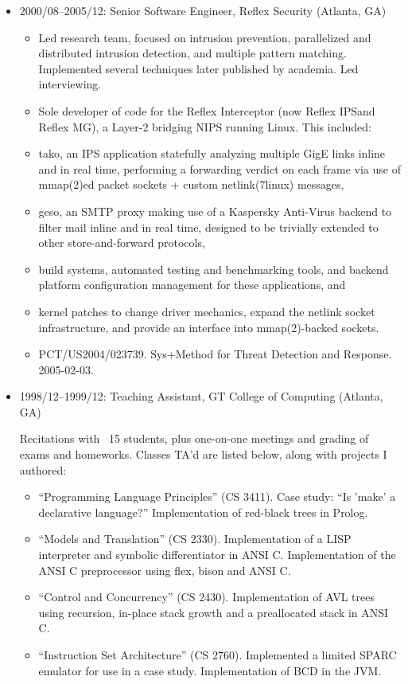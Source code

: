 \documentclass{article}
\newenvironment{tightitemize}
{\begin{itemize}
  \setlength{\itemsep}{1pt}
  \setlength{\parskip}{0pt}
  \setlength{\parsep}{0pt}}
{\end{itemize}}
\begin{document}
\begin{tightitemize}
\item 2000/08--2005/12: Senior Software Engineer, Reflex Security (Atlanta, GA)

\begin{tightitemize}
\item Led research team, focused on intrusion prevention, parallelized and
  distributed intrusion detection, and multiple pattern matching. Implemented
  several techniques later published by academia. Led interviewing.
\item Sole developer of code for the Reflex Interceptor (now Reflex IPS\texttrademark and
  Reflex MG\texttrademark), a Layer-2 bridging NIPS running Linux. This included:
    \item tako, an IPS application statefully analyzing multiple GigE links inline
      and in real time, performing a forwarding verdict on each frame via use
      of mmap(2)ed packet sockets + custom netlink(7linux) messages,
    \item geso, an SMTP proxy making use of a Kaspersky Anti-Virus backend to
      filter mail inline and in real time, designed to be trivially extended
      to other store-and-forward protocols,
    \item build systems, automated testing and benchmarking tools, and backend
      platform configuration management for these applications, and
    \item kernel patches to change driver mechanics, expand the netlink socket
      infrastructure, and provide an interface into mmap(2)-backed sockets.
\item PCT/US2004/023739. Sys+Method for Threat Detection and Response. 2005-02-03.
\end{tightitemize}

\item 1998/12--1999/12: Teaching Assistant, GT College of Computing (Atlanta, GA)

Recitations with ~15 students, plus one-on-one meetings and grading of exams
and homeworks. Classes TA'd are listed below, along with projects I authored:

\begin{tightitemize}
\item ``Programming Language Principles'' (CS 3411). Case study: ``Is 'make' a
   declarative language?'' Implementation of red-black trees in Prolog.
\item ``Models and Translation'' (CS 2330). Implementation of a LISP interpreter
   and symbolic differentiator in ANSI C. Implementation of the ANSI C
   preprocessor using flex, bison and ANSI C.
\item ``Control and Concurrency'' (CS 2430). Implementation of AVL trees using
   recursion, in-place stack growth and a preallocated stack in ANSI C.
\item ``Instruction Set Architecture'' (CS 2760). Implemented a limited SPARC
   emulator for use in a case study. Implementation of BCD in the JVM.
\end{tightitemize}


\end{tightitemize}
\end{document}
